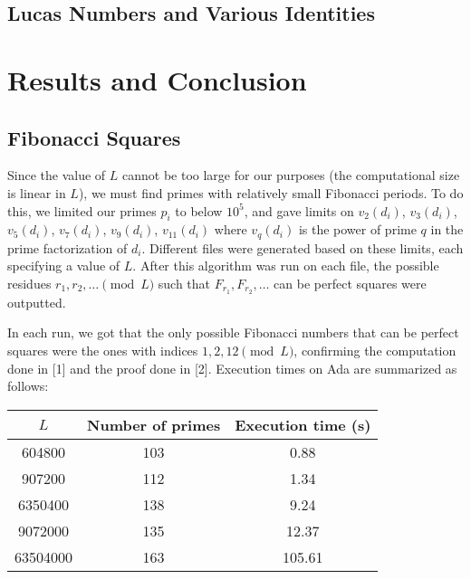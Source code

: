 \documentclass[11pt]{article}
\begin{document}
\subsection{Lucas Numbers and Various Identities}



\section{Results and Conclusion}

\subsection{Fibonacci Squares}
Since the value of $L$ cannot be too large for our purposes (the computational size is linear in $L$), we must find primes with relatively small Fibonacci periods. To do this, we limited our primes $p_i$ to below $10^5$, and gave limits on $v_2(d_i)$, $v_3(d_i)$, $v_5(d_i)$, $v_7(d_i)$, $v_9(d_i)$, $v_{11}(d_i)$ where $v_q(d_i)$ is the power of prime $q$ in the prime factorization of $d_i$. Different files were generated based on these limits, each specifying a value of $L$. After this algorithm was run on each file, the possible residues $r_1, r_2, \dots \pmod L$ such that $F_{r_1}, F_{r_2}, \dots$ can be perfect squares were outputted.

In each run, we got that the only possible Fibonacci numbers that can be perfect squares were the ones with indices $1, 2, 12 \pmod{L}$, confirming the computation done in [1] and the proof done in [2]. Execution times on Ada are summarized as follows:

\begin{tabular}{ccc}
\hline
$L$ & Number of primes & Execution time (s) \\ \hline
604800 & 103 & 0.88 \\
907200 & 112 & 1.34 \\
6350400 & 138 & 9.24 \\
9072000 & 135 & 12.37 \\
63504000 & 163 & 105.61 \\ \hline \hline
\end{tabular}
\end{document}
